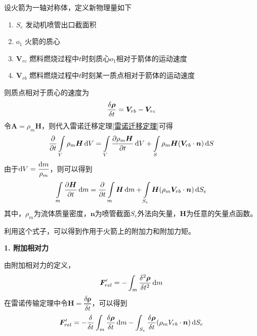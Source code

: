 \noindent 设火箭为一轴对称体，定义新物理量如下\vspace*{-0.5em}
\begin{enumerate}[\hspace*{2em}]
	\item $S_e$ \quad 发动机喷管出口截面积\vspace*{-0.5em}
	\item $o_1$ \quad 火箭的质心\vspace*{-0.5em}
	\item $\bm{V}_{rc}$ \quad 燃料燃烧过程中$t$时刻质心$o_1$相对于箭体的运动速度\vspace*{-0.5em}
	\item $\bm{V}_{rb}$ \quad 燃料燃烧过程中$t$时刻某一质点相对于箭体的运动速度
\end{enumerate}
则质点相对于质心的速度为
\begin{equation}
	\dfrac{\delta \bm{\bm{\rho}}}{\delta t} = \bm{V}_{rb} - \bm{V}_{rc}
	\label{dp}
\end{equation}
令$\bm{A} = \rho_m \bm{H}$，则代入雷诺迁移定理\eqref{雷诺迁移定理}可得
\begin{equation*}
	\dfrac{\partial }{\partial t}\int\limits_{V} \rho_m \bm{H} \, {\rm{d}} V =  \int\limits_{V} \dfrac{\partial \rho_m \bm{H}}{\partial t} \, {\rm{d}} V + \int\limits_{S} \rho_m \bm{H} (\bm{V}_{rb} \cdot \bm{n})\, {\rm{d}} S
\end{equation*}
由于${\rm{d}} V = \dfrac{{\rm{d}} m}{\rho_m}$，则可以得到
\begin{equation}
	 \int\limits_{m} \dfrac{\partial \bm{H}}{\partial t} \, {\rm{d}} m  =  \dfrac{\partial }{\partial t}\int\limits_{m} \bm{H} \, {\rm{d}} m + \int\limits_{S_e}  \bm{H} (\rho_m \bm{V}_{rb} \cdot \bm{n})\, {\rm{d}} S_e
\end{equation}
其中，$\rho_m$为流体质量密度，$\bm{n}$为喷管截面$S_e$外法向矢量，$\bm{H}$为任意的矢量点函数。

利用这个式子，可以得到作用于火箭上的附加力和附加力矩。
\vspace*{1em}

\noindent \textbf{1. 附加相对力}

由附加相对力的定义，
\begin{equation*}
	\bm{F}'_{rel} = - \int_m \dfrac{\delta^2 \bm{\bm{\rho}}}{\delta t^2}\, {\rm{d}} m 
\end{equation*}
在雷诺传输定理中令$\bm{H} = \dfrac{\delta \bm{\rho}}{\delta t}$，可以得到
\begin{equation}
	\bm{F}'_{rel} = - \dfrac{\delta}{\delta t}\int_m \dfrac{\delta \bm{\rho}}{\delta t} \, {\rm{d}} m - \int_{S_e} \dfrac{\delta \bm{\rho}}{\delta t} (\rho_m V_{rb}\cdot \bm{n}) \, {\rm{d}} S_{e}
	\label{附加相对力1}
\end{equation}


